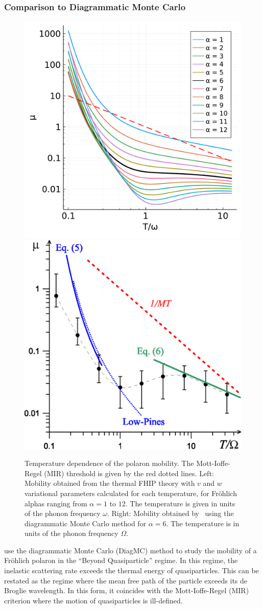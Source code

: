 \subsubsection{Comparison to Diagrammatic Monte Carlo}

\begin{figure}[t]
    \centering
    \includegraphics[width=.49\textwidth]{figures/moblility_temp_alpha.pdf}
    \includegraphics[width=.49\textwidth]{figures/medium (1).png}
    
    \caption{Temperature dependence of the polaron mobility. The Mott-Ioffe-Regel (MIR) threshold is given by the red dotted lines. Left: Mobility obtained from the thermal FHIP theory with $v$ and $w$ variational parameters calculated for each temperature, for Fr\"ohlich alphas ranging from $\alpha = 1$ to  $12$. The temperature is given in units of the phonon frequency $\omega$. Right: Mobility obtained by~\cite{mishchenko_polaron_2019} using the diagrammatic Monte Carlo method for $\alpha = 6$. The temperature is in units of the phonon frequency $\Omega$.}
    \label{fig:mishchenko2}
\end{figure}

\cite{mishchenko_polaron_2019} use the diagrammatic Monte Carlo (DiagMC) method to study the mobility of a Fr\"ohlich polaron in the ``Beyond Quasiparticle'' regime. In this regime, the inelastic scattering rate exceeds the thermal energy of quasiparticles. This can be restated as the regime where the mean free path of the particle exceeds its de Broglie wavelength. In this form, it coincides with the Mott-Ioffe-Regel (MIR) criterion where the motion of quasiparticles is ill-defined. 

